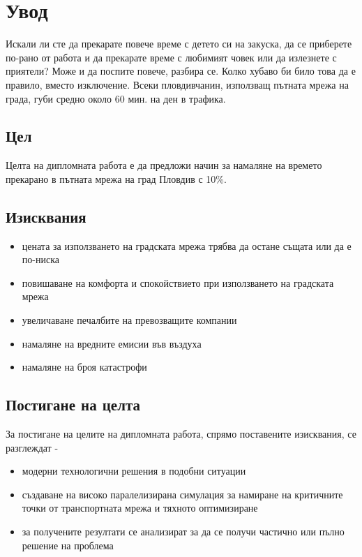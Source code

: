 \chapter{Увод}

	Искали ли сте да прекарате повече време с детето си на закуска, 
	да се приберете по-рано от работа и да прекарате време с любимият човек или да излезнете с приятели? 
	Може и да поспите повече, разбира се. Колко хубаво би било това да е правило, вместо изключение.
	Всеки пловдивчанин, използващ пътната мрежа на града, губи средно около 60 мин. на ден в трафика. 

	\section{Цел}

	Целта на дипломната работа е да предложи начин за намаляне на времето прекарано в пътната мрежа на град Пловдив с 10\%. 

	\section{Изисквания}

		\begin{itemize}
			\item цената за използването на градската мрежа трябва да остане същата или да е по-ниска
			\item повишаване на комфорта и спокойствието при използването на градската мрежа
			\item увеличаване печалбите на превозващите компании
			\item намаляне на вредните емисии във въздуха
			\item намаляне на броя катастрофи
		\end{itemize}

	\section{Постигане на целта}

		За постигане на целите на дипломната работа, спрямо поставените изисквания, се разглеждат - 
	
		\begin{itemize}
			\item модерни технологични решения в подобни ситуации
			\item създаване на високо паралелизирана симулация за намиране на критичните точки от транспортната мрежа и тяхното оптимизиране
			\item за получените резултати се анализират за да се получи частично или пълно решение на проблема
		\end{itemize}

